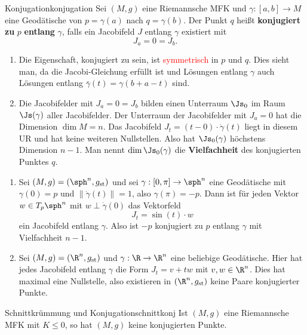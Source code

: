 \begin{definition}{Konjugation}{konjugation}
Sei $(M,g)$ eine Riemannsche MFK und $\gamma: [a,b] \to M$ eine Geodätische von $p = \gamma(a)$ nach $q = \gamma(b)$. Der Punkt $q$ heißt \textbf{konjugiert zu} $p$ \textbf{entlang} $\gamma$, falls ein Jacobifeld $J$ entlang $\gamma$ existiert mit 
\begin{equation}
J_a = 0 = J_b.
\end{equation}
\end{definition}
\begin{bemerkungen}
\begin{enumerate}
\item
Die Eigenschaft, konjugiert zu sein, ist \textcolor{red}{symmetrisch} in $p$ und $q$. Dies sieht man, da die Jacobi-Gleichung erfüllt ist und Lösungen entlang $\gamma$ auch Lösungen entlang $\bar{\gamma} (t) = \gamma(b+a-t)$ sind.
\item Die Jacobifelder mit $J_a = 0 = J_b$ bilden einen Unterraum $\Js_0$ im Raum $\Js (\gamma)$ aller Jacobifelder. Der Unterraum der Jacobifelder mit $J_a=0$ hat die Dimension $\dim M = n$. Das Jacobifeld $J_t = (t-0)\cdot \dot{\gamma}(t)$ liegt in diesem UR und hat keine weiteren Nullstellen. Also hat $\Js_0(\gamma)$ höchstens Dimension $n-1$. Man nennt $\dim \Js_0(\gamma)$ die \textbf{Vielfachheit} des konjugierten Punktes $q$.
\end{enumerate}
\end{bemerkungen}
\begin{beispiele}
\begin{enumerate}
\item Sei $(M,g)=(\sph^n, g_\text{st})$ und sei $\gamma: [0, \pi] \to \sph^n$ eine Geodätische mit $\gamma(0)=p$ und $\| \dot{\gamma}(t) \| = 1$, also $\gamma(\pi)=-p$. Dann ist für jeden Vektor $w \in T_p\sph^n$ mit $w \perp \dot{\gamma}(0)$ das Vektorfeld 
\begin{equation}
J_t = \sin (t) \cdot w
\end{equation}
ein Jacobifeld entlang $\gamma$. Also ist $-p$ konjugiert zu $p$ entlang $\gamma$ mit Vielfachheit $n-1$.
\item  Sei $(M,g) = (\R^n, g_\text{st})$ und $\gamma: \R \to \R^n$ eine beliebige Geodätische. Hier hat jedes Jacobifeld entlang $\gamma$ die Form $J_t = v+tw$ mit $v,w \in \R^n$. Dies hat maximal eine Nullstelle, also existieren in $(\R^n, g_\text{st})$ keine Paare konjugierter Punkte.
\end{enumerate}
\end{beispiele}
\begin{lemma}{Schnittkrümmung und Konjugation}{schnittkonj}
Ist $(M,g)$ eine Riemannsche MFK mit $K \leq 0$, so hat $(M,g)$ keine konjugierten Punkte.
\end{lemma}
